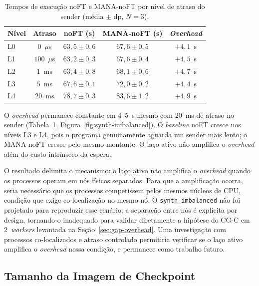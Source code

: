 \begin{table}[htb]
  \caption{Tempos de execução noFT e MANA-noFT por nível de atraso do sender
           (média $\pm$ dp, $N{=}3$).}
  \label{tab:synth-imbalanced}
  \centering
  \begin{tabular}{lcccc}
    \toprule
    Nível & Atraso & noFT (s) & MANA-noFT (s) & \textit{Overhead} \\
    \midrule
    L0 & $0$~$\mu$s    & $63{,}5 \pm 0{,}6$ & $67{,}6 \pm 0{,}5$ & $+4{,}1$~s \\
    L1 & $100$~$\mu$s  & $63{,}2 \pm 0{,}3$ & $67{,}6 \pm 0{,}4$ & $+4{,}5$~s \\
    L2 & $1$~ms        & $63{,}4 \pm 0{,}8$ & $68{,}1 \pm 0{,}6$ & $+4{,}7$~s \\
    L3 & $5$~ms        & $67{,}6 \pm 0{,}1$ & $72{,}0 \pm 0{,}2$ & $+4{,}4$~s \\
    L4 & $20$~ms       & $78{,}7 \pm 0{,}3$ & $83{,}6 \pm 1{,}2$ & $+4{,}9$~s \\
    \bottomrule
  \end{tabular}
\end{table}

O \textit{overhead} permanece constante em 4--5~s mesmo com 20~ms de atraso no sender
(Tabela~\ref{tab:synth-imbalanced}, Figura~\ref{fig:synth-imbalanced}). O \textit{baseline}
noFT cresce nos níveis L3 e L4, pois o programa genuinamente aguarda um sender mais
lento; o MANA-noFT cresce pelo mesmo montante. O laço ativo não amplifica o
\textit{overhead} além do custo intrínseco da espera.

O resultado delimita o mecanismo: o laço ativo não amplifica o \textit{overhead} quando
os processos operam em nós físicos separados. Para que a amplificação ocorra, seria
necessário que os processos competissem pelos mesmos núcleos de CPU, condição que exige
co-localização no mesmo nó. O \texttt{synth\_imbalanced} não foi projetado para
reproduzir esse cenário: a separação entre nós é explícita por design, tornando-o
inadequado para validar diretamente a hipótese do CG-C em 2~\textit{workers} levantada
na Seção~\ref{sec:gap-overhead}. Uma investigação com processos co-localizados e atraso
controlado permitiria verificar se o laço ativo amplifica o \textit{overhead} nessa
condição, e permanece como trabalho futuro.

\subsection{Tamanho da Imagem de Checkpoint}
\label{sec:sintetico-checkpoint}


